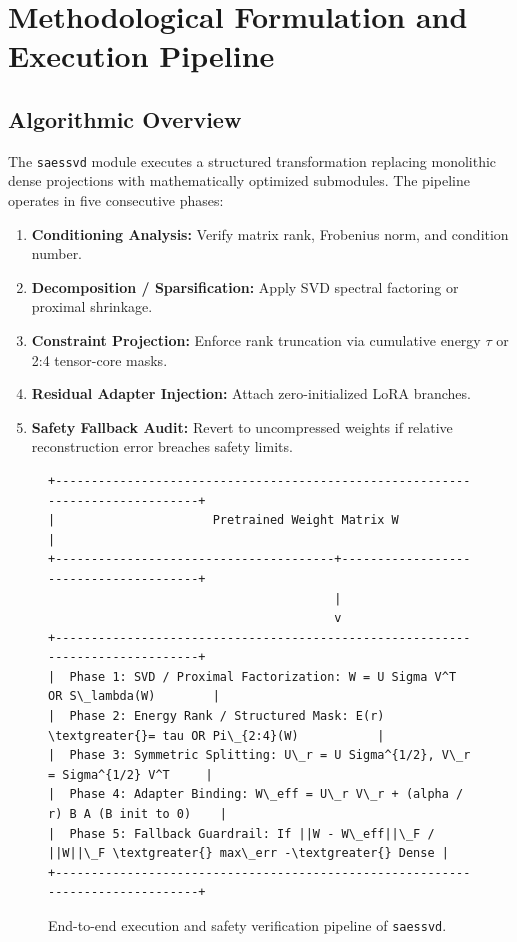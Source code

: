 \section{Methodological Formulation and Execution Pipeline}

\subsection{Algorithmic Overview}
The \texttt{saessvd} module executes a structured transformation replacing monolithic dense projections with mathematically optimized submodules. The pipeline operates in five consecutive phases:
\begin{enumerate}
\item \textbf{Conditioning Analysis:} Verify matrix rank, Frobenius norm, and condition number.
\item \textbf{Decomposition / Sparsification:} Apply SVD spectral factoring or proximal shrinkage.
\item \textbf{Constraint Projection:} Enforce rank truncation via cumulative energy $\tau$ or 2:4 tensor-core masks.
\item \textbf{Residual Adapter Injection:} Attach zero-initialized LoRA branches.
\item \textbf{Safety Fallback Audit:} Revert to uncompressed weights if relative reconstruction error breaches safety limits.
\end{enumerate}

\begin{figure}[t]
\centering
\begin{verbatim}
+-------------------------------------------------------------------------------+
|                      Pretrained Weight Matrix W                               |
+---------------------------------------+---------------------------------------+
                                        |
                                        v
+-------------------------------------------------------------------------------+
|  Phase 1: SVD / Proximal Factorization: W = U Sigma V^T OR S\_lambda(W)        |
|  Phase 2: Energy Rank / Structured Mask: E(r) \textgreater{}= tau OR Pi\_{2:4}(W)           |
|  Phase 3: Symmetric Splitting: U\_r = U Sigma^{1/2}, V\_r = Sigma^{1/2} V^T     |
|  Phase 4: Adapter Binding: W\_eff = U\_r V\_r + (alpha / r) B A (B init to 0)    |
|  Phase 5: Fallback Guardrail: If ||W - W\_eff||\_F / ||W||\_F \textgreater{} max\_err -\textgreater{} Dense |
+-------------------------------------------------------------------------------+
\end{verbatim}
\caption{End-to-end execution and safety verification pipeline of \texttt{saessvd}.}
\end{figure}


